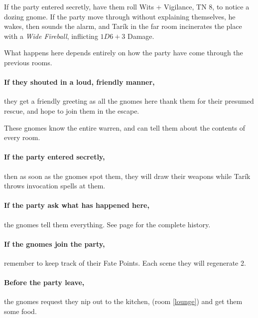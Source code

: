 \begin{multicols}{2}
\begin{boxtext}
\end{boxtext}

If the party entered secretly, have them roll Wits + Vigilance, TN 8, to notice a dozing gnome.
If the party move through without explaining themselves, he wakes, then sounds the alarm, and Tar\'ik in the far room incinerates the place with a \textit{Wide Fireball}, inflicting $1D6 +3$ Damage.



What happens here depends entirely on how the party have come through the previous rooms.

\paragraph{If they shouted in a loud, friendly manner,}
they get a friendly greeting as all the gnomes here thank them for their presumed rescue, and hope to join them in the escape.

These gnomes know the entire warren, and can tell them about the contents of every room.

\paragraph{If the party entered secretly,}
then as soon as the gnomes spot them, they will draw their weapons while Tar\'ik throws invocation spells at them.

\paragraph{If the party ask what has happened here,}
the gnomes tell them everything.
See page \pageref{invasionhistory} for the complete history.

\paragraph{If the gnomes join the party,}
remember to keep track of their Fate Points.
Each scene they will regenerate 2.

\paragraph{Before the party leave,}
the gnomes request they nip out to the kitchen, (room \ref{lounge}) and get them some food.


\end{multicols}
